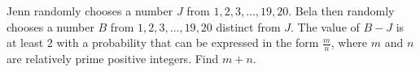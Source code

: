 Jenn randomly chooses a number $J$ from $1,2,3,\ldots,19,20$. Bela then randomly chooses a number $B$ from $1,2,3,\ldots,19,20$ distinct from $J$. The value of $B-J$ is at least $2$ with a probability that can be expressed in the form $\frac{m}{n}$, where $m$ and $n$ are relatively prime positive integers. Find $m+n$.